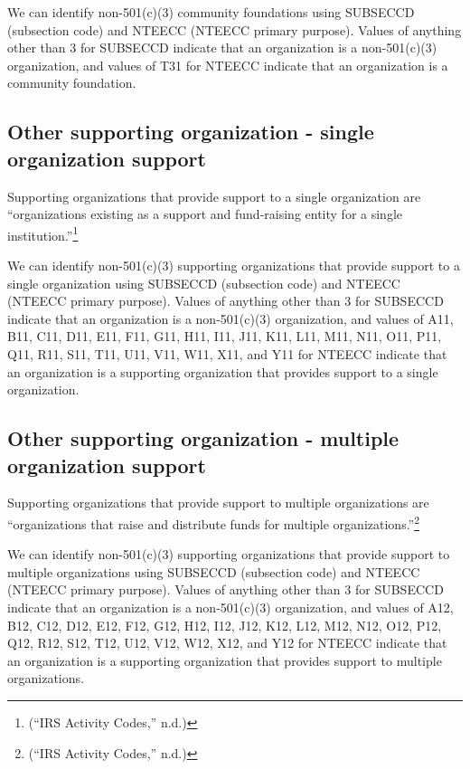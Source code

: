 \documentclass[
  letterpaper,
  DIV=11,
  numbers=noendperiod]{scrreprt}
\begin{document}
We can identify non-501(c)(3) community foundations using SUBSECCD
(subsection code) and NTEECC (NTEECC primary purpose). Values of
anything other than 3 for SUBSECCD indicate that an organization is a
non-501(c)(3) organization, and values of T31 for NTEECC indicate that
an organization is a community foundation.

\hypertarget{other-supporting-organization---single-organization-support}{%
\subsection{Other supporting organization - single organization
support}\label{other-supporting-organization---single-organization-support}}

Supporting organizations that provide support to a single organization
are ``organizations existing as a support and fund-raising entity for a
single institution.''\footnote{({``IRS Activity Codes,''} n.d.)}

We can identify non-501(c)(3) supporting organizations that provide
support to a single organization using SUBSECCD (subsection code) and
NTEECC (NTEECC primary purpose). Values of anything other than 3 for
SUBSECCD indicate that an organization is a non-501(c)(3) organization,
and values of A11, B11, C11, D11, E11, F11, G11, H11, I11, J11, K11,
L11, M11, N11, O11, P11, Q11, R11, S11, T11, U11, V11, W11, X11, and Y11
for NTEECC indicate that an organization is a supporting organization
that provides support to a single organization.

\hypertarget{other-supporting-organization---multiple-organization-support}{%
\subsection{Other supporting organization - multiple organization
support}\label{other-supporting-organization---multiple-organization-support}}

Supporting organizations that provide support to multiple organizations
are ``organizations that raise and distribute funds for multiple
organizations.''\footnote{({``IRS Activity Codes,''} n.d.)}

We can identify non-501(c)(3) supporting organizations that provide
support to multiple organizations using SUBSECCD (subsection code) and
NTEECC (NTEECC primary purpose). Values of anything other than 3 for
SUBSECCD indicate that an organization is a non-501(c)(3) organization,
and values of A12, B12, C12, D12, E12, F12, G12, H12, I12, J12, K12,
L12, M12, N12, O12, P12, Q12, R12, S12, T12, U12, V12, W12, X12, and Y12
for NTEECC indicate that an organization is a supporting organization
that provides support to multiple organizations.
\end{document}
